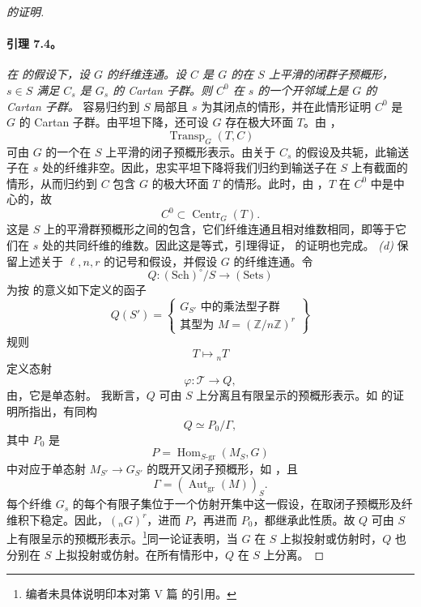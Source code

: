 \begin{proof}[ 的证明]
\paragraph{\textbf{引理 7.4。}}
\emph{在  的假设下，设 \(G\) 的纤维连通。设 \(C\) 是 \(G\) 的在 \(S\) 上平滑的闭群子预概形，\(s\in S\) 满足 \(C_s\) 是 \(G_s\) 的 Cartan 子群。则 \(C^0\) 在 \(s\) 的一个开邻域上是 \(G\) 的 Cartan 子群。}
容易归约到 \(S\) 局部且 \(s\) 为其闭点的情形，并在此情形证明 \(C^0\) 是 \(G\) 的 Cartan 子群。由平坦下降，还可设 \(G\) 存在极大环面 \(T\)。由 ，
\[
  \operatorname{Transp}_G(T,C)
\]
可由 \(G\) 的一个在 \(S\) 上平滑的闭子预概形表示。由关于 \(C_s\) 的假设及共轭，此输送子在 \(s\) 处的纤维非空。因此，忠实平坦下降将我们归约到输送子在 \(S\) 上有截面的情形，从而归约到 \(C\) 包含 \(G\) 的极大环面 \(T\) 的情形。此时，由 ，\(T\) 在 \(C^0\) 中是中心的，故
\[
  C^0\subset \operatorname{Centr}_G(T).
\]
这是 \(S\) 上的平滑群预概形之间的包含，它们纤维连通且相对维数相同，即等于它们在 \(s\) 处的共同纤维的维数。因此这是等式，引理得证，\textup{} 的证明也完成。
\emph{(d)} 保留上述关于 \(\ell,n,r\) 的记号和假设，并假设 \(G\) 的纤维连通。令
\[
  Q:(\mathrm{Sch})^\circ/S\longrightarrow(\mathrm{Sets})
\]
为按  的意义如下定义的函子
\[
  Q(S')=
  \left\{
  \begin{array}{c}
  \text{\(G_{S'}\) 中的乘法型子群}\\
  \text{其型为 \(M=(\mathbb Z/n\mathbb Z)^r\)}
  \end{array}
  \right\}
\]
规则
\[
  T\longmapsto{}_nT
\]
定义态射
\[
  \varphi:\mathcal T\longrightarrow Q,
\]
由，它是单态射。
我断言，\(Q\) 可由 \(S\) 上分离且有限呈示的预概形表示。如  的证明所指出，有同构
\[
  Q\simeq P_0/\Gamma,
\]
其中 \(P_0\) 是
\[
  P=\operatorname{Hom}_{S\text{-gr}}(M_S,G)
\]
中对应于单态射 \(M_{S'}\to G_{S'}\) 的既开又闭子预概形，如 ，且
\[
  \Gamma=(\operatorname{Aut}_{\mathrm{gr}}(M))_S.
\]
每个纤维 \(G_s\) 的每个有限子集位于一个仿射开集中这一假设，在取闭子预概形及纤维积下稳定。因此，\(({}_nG)^r\)，进而 \(P\)，再进而 \(P_0\)，都继承此性质。故 \(Q\) 可由 \(S\) 上有限呈示的预概形表示。\footnote{编者未具体说明印本对第 V 篇 的引用。}同一论证表明，当 \(G\) 在 \(S\) 上拟投射或仿射时，\(Q\) 也分别在 \(S\) 上拟投射或仿射。在所有情形中，\(Q\) 在 \(S\) 上分离。

\end{proof}
